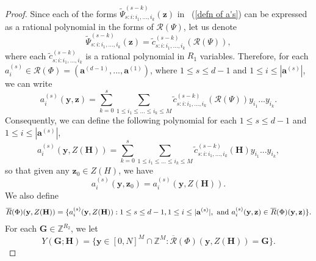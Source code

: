 \documentclass[12pt]{amsart}
\theoremstyle{definition}
\theoremstyle{remark}
\numberwithin{equation}{section}
\begin{document}
\begin{proof}
Since each of the forms $\widetilde{\Psi}^{(s - k)}_{{s} :i: i_1, ..., i_k}(\mathbf{z})$ in ~(\ref{defn of a's}) can be expressed as a rational polynomial
in the forms of $\mathcal{R}(\Psi)$, let us denote
$$
\widetilde{\Psi}^{(s - k)}_{{s} :i: i_1, ..., i_k}(\mathbf{z}) = \widetilde{c}^{(s - k)}_{{s} :i: i_1, ..., i_k}(\mathcal{R}(\Psi)),
$$
where each $\widetilde{c}^{(s - k)}_{{s} :i: i_1, ..., i_k}$ is a rational polynomial in $R_1$ variables.
Therefore, for each $a^{({s})}_i \in \mathcal{R}(\Phi) = ( \mathbf{a}^{(d-1)}, ..., \mathbf{a}^{(1)} )$,
where $1 \leq s \leq d-1$ and $1 \leq i \leq |\mathbf{a}^{(s)}|$,
we can write
\begin{equation}
\label{def of a's 2}
a^{({s})}_i(\mathbf{y}, \mathbf{z}) = \sum_{k=0}^{s} \sum_{1 \leq i_1 \leq ... \leq i_k \leq M} \widetilde{c}^{(s - k)}_{{s} :i: i_1, ..., i_k}(\mathcal{R}(\Psi)) y_{i_1} ... y_{i_k}.
\end{equation}
Consequently, we can define the following polynomial for each $1 \leq s \leq d-1$ and $1 \leq i \leq |\mathbf{a}^{(s)}|$,
\begin{equation}
\label{def of a's 3}
a^{({s})}_i(\mathbf{y}, Z(\mathbf{H})  ) = \sum_{k=0}^{s} \sum_{1 \leq i_1 \leq ... \leq i_k \leq M} \widetilde{c}^{(s - k)}_{{s} :i: i_1, ..., i_k}(\mathbf{H} ) y_{i_1} ... y_{i_k},
\end{equation}
so that given any $\mathbf{z}_0 \in Z(H)$, we have
$$
a^{({s})}_i(\mathbf{y}, \mathbf{z}_0  ) = a^{({s})}_i(\mathbf{y}, Z(\mathbf{H}) ).
$$
We also define
\begin{eqnarray}
\overline{R}(\Phi)(\mathbf{y}, Z(\mathbf{H}) ) = \{ a^{({s})}_i(\mathbf{y}, Z(\mathbf{H})  ) :
1 \leq s \leq d-1, 1 \leq i \leq |\mathbf{a}^{(s)}|,  \text{ and }  a^{({s})}_i(\mathbf{y}, \mathbf{z})  \in \overline{R}(\Phi)(\mathbf{y},\mathbf{z} )
\}.
\notag
\end{eqnarray}
For each $\mathbf{G} \in \mathbb{Z}^{R_2}$, we let
$$
Y(\mathbf{G};\mathbf{H}) = \{ \mathbf{y} \in [0, N]^{ M } \cap \mathbb{Z}^{M} : \overline{\mathcal{R}}(\Phi) (\mathbf{y}, Z(\mathbf{H}) ) = \mathbf{G} \}.
$$


\end{proof}
\end{document}

